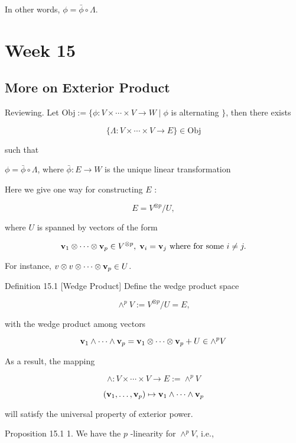 \documentclass[11pt]{article}
\begin{document}
In other words, \(\phi  = \bar{\phi } \circ  \Lambda\).

\section{Week 15}
\subsection{More on Exterior Product}

Reviewing. Let \(\mathrm{{Obj}} \mathrel{\text{ := }} \{ \phi  : V \times  \cdots  \times  V \rightarrow  W \mid  \phi\) is alternating \(\}\), then there exists

\[
\{ \Lambda  : V \times  \cdots  \times  V \rightarrow  E\}  \in  \mathrm{{Obj}}
\]

such that

\(\phi  = \bar{\phi } \circ  \Lambda\), where \(\bar{\phi } : E \rightarrow  W\) is the unique linear transformation

Here we give one way for constructing \(E\) :

\[
E = {V}^{\otimes p}/U,
\]

where \(U\) is spanned by vectors of the form

\[
{\bf v}_1 \otimes  \cdots  \otimes  {\bf v}_{p} \in  {V}^{\otimes p},\;{\bf v}_{i} = {\bf v}_{j}\text{ where for some }i \neq  j.
\]

For instance, \(v \otimes  v \otimes  \cdots  \otimes  {\bf v}_{p} \in  U\).

Definition 15.1 [Wedge Product] Define the wedge product space

\[
{ \land  }^{p}V \mathrel{\text{ := }} {V}^{\otimes p}/U = E,
\]

with the wedge product among vectors

\[
{\bf v}_1 \land  \cdots  \land  {\bf v}_{p} = {\bf v}_1 \otimes  \cdots  \otimes  {\bf v}_{p} + U \in  { \land  }^{p}V
\]

As a result, the mapping

\[
\land   : V \times  \cdots  \times  V \rightarrow  E \mathrel{\text{ := }} { \land  }^{p}V
\]

\[
\left( {{\bf v}_1,\ldots ,{\bf v}_{p}}\right)  \mapsto  {\bf v}_1 \land  \cdots  \land  {\bf v}_{p}
\]

will satisfy the universal property of exterior power.

Proposition 15.1 1. We have the \(p\) -linearity for \({ \land  }^{p}V\), i.e.,
\end{document}
